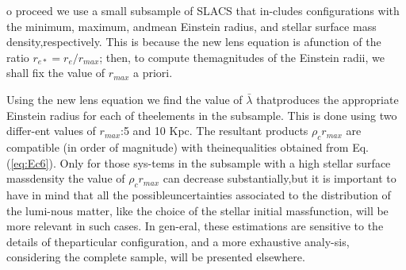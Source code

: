 \documentclass[9.5pt, twocolumn]{article}
\begin{document}
o proceed we use a small subsample of SLACS that in-cludes configurations with the minimum, maximum, andmean  Einstein  radius,  and  stellar  surface  mass  density,respectively.  This is because the new lens equation is afunction of the ratio \(r_{e*}=r_{e}/r_{max}\); then, to compute themagnitudes of the Einstein radii, we shall fix the value of \(r_{max}\) a priori. 

Using the new lens equation we find the value of \(\bar{\lambda}\) thatproduces the appropriate Einstein radius for each of theelements in the subsample.  This is done using two differ-ent values of \(r_{max}\):5 and 10 Kpc.  The resultant products \(\rho_{c}r_{max}\) are compatible (in order of magnitude) with theinequalities obtained from Eq.  (\ref{eq:Ec6}).  Only for those sys-tems in the subsample with a high stellar surface massdensity  the  value  of \(\rho_{c}r_{max}\) can  decrease  substantially,but it is important to have in mind that all the possibleuncertainties associated to the distribution of the lumi-nous  matter,  like  the  choice  of  the  stellar  initial  massfunction,  will  be  more  relevant  in  such  cases.   In  gen-eral, these estimations are sensitive to the details of theparticular  configuration,  and  a  more  exhaustive  analy-sis,  considering  the  complete  sample,  will  be  presented elsewhere.
\end{document}
